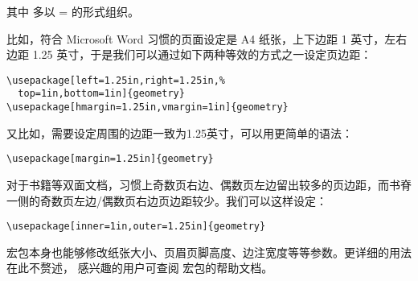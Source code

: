 其中  多以 = 的形式组织。

比如，符合 Microsoft Word 习惯的页面设定是 A4 纸张，上下边距 1 英寸，左右边距 1.25 英寸，于是我们可以通过如下两种等效的方式之一设定页边距：
\begin{verbatim}
\usepackage[left=1.25in,right=1.25in,%
  top=1in,bottom=1in]{geometry}
\usepackage[hmargin=1.25in,vmargin=1in]{geometry}
\end{verbatim}

又比如，需要设定周围的边距一致为1.25英寸，可以用更简单的语法：
\begin{verbatim}
\usepackage[margin=1.25in]{geometry}
\end{verbatim}

对于书籍等双面文档，习惯上奇数页右边、偶数页左边留出较多的页边距，而书脊一侧的奇数页左边/偶数页右边页边距较少。我们可以这样设定：
\begin{verbatim}
\usepackage[inner=1in,outer=1.25in]{geometry}
\end{verbatim}

 宏包本身也能够修改纸张大小、页眉页脚高度、边注宽度等等参数。更详细的用法在此不赘述，
感兴趣的用户可查阅  宏包的帮助文档。

\endinput